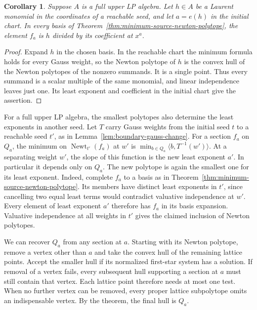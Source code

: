 \documentclass[11pt,reqno]{amsart}
\numberwithin{equation}{section}
\newtheorem{corollary}[theorem]{Corollary}
\theoremstyle{definition}
\theoremstyle{remark}
\DeclareMathOperator{\Newt}{Newt}
\begin{document}
\begin{corollary}\label{cor:reachable-monomials-minimum-basis}
Suppose \(A\) is a full upper LP algebra. Let \(h\in A\) be a Laurent
monomial in the coordinates of a reachable seed, and let \(a=e(h)\)
in the initial chart. In every basis of
Theorem~\ref{thm:minimum-source-newton-polytope}, the element \(f_a\)
is \(h\) divided by its coefficient at \(x^a\).
\end{corollary}
\begin{proof}
Expand \(h\) in the chosen basis. In the reachable chart the minimum
formula holds for every Gauss weight, so the Newton polytope of \(h\)
is the convex hull of the Newton polytopes of the nonzero summands.
It is a single point. Thus every summand is a scalar multiple of the
same monomial, and linear independence leaves just one. Its least
exponent and coefficient in the initial chart give the assertion.
\end{proof}

For a full upper LP algebra, the smallest polytopes also determine the
least exponents in another seed. Let \(T\) carry Gauss weights from the
initial seed \(t\) to a reachable seed \(t'\), as in
Lemma~\ref{lem:boundary-gauss-change}. For a section \(f_a\) on \(Q_a\),
the minimum on \(\Newt_{t'}(f_a)\) at \(w'\) is
\(\min_{b\in Q_a}\langle b,T^{-1}(w')\rangle\).
At a separating weight \(w'\), the slope of this function is the new
least exponent \(a'\). In particular it depends only on \(Q_a\).
The new polytope is again the smallest one for its least exponent.
Indeed, complete \(f_a\) to a basis as in
Theorem~\ref{thm:minimum-source-newton-polytope}. Its members have
distinct least exponents in \(t'\), since cancelling two equal least
terms would contradict valuative independence at \(w'\). Every
element of least exponent \(a'\) therefore has \(f_a\) in its basis
expansion. Valuative independence at all weights in \(t'\) gives the
claimed inclusion of Newton polytopes.

We can recover \(Q_a\) from any section at \(a\). Starting with its
Newton polytope, remove a vertex other than \(a\) and take the convex
hull of the remaining lattice points. Accept the smaller hull if its
normalized first-star system has a solution. If removal of a vertex
fails, every subsequent hull supporting a section at \(a\) must still
contain that vertex. Each lattice point therefore needs at most one
test. When no further vertex can be removed, every proper lattice
subpolytope omits an indispensable vertex. By the theorem, the final
hull is \(Q_a\).
\end{document}
